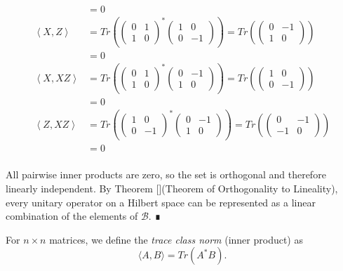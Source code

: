 \begin{theorem}
\begin{align*}
            &= 0\\
\left<X, Z\right> &= Tr\left( \begin{pmatrix}0 & 1 \\1 & 0\end{pmatrix}^* \begin{pmatrix}1 & 0 \\0 & -1\end{pmatrix} \right) = Tr\left(\begin{pmatrix}0 & -1 \\1 & 0\end{pmatrix}\right)\\
            &= 0\\
\left<X, XZ\right> &= Tr\left( \begin{pmatrix}0 & 1 \\1 & 0\end{pmatrix}^* \begin{pmatrix}0 & -1 \\1 & 0\end{pmatrix} \right) = Tr\left(\begin{pmatrix}1 & 0 \\0 & -1\end{pmatrix}\right)\\
            &= 0\\
\left<Z, XZ\right> &= Tr\left( \begin{pmatrix}1 & 0 \\0 & -1\end{pmatrix}^* \begin{pmatrix}0 & -1 \\1 & 0\end{pmatrix} \right) = Tr\left(\begin{pmatrix}0 & -1 \\-1 & 0\end{pmatrix}\right)\\
            &= 0\\
\end{align*}

All pairwise inner products are zero, so the set is orthogonal and therefore linearly independent. By Theorem [](Theorem of Orthogonality to Lineality), every unitary operator on a Hilbert space can be represented as a linear combination of the elements of $\mathcal{B}$. ∎

\end{theorem}\begin{definition}\label{trace_class_norm}For $n\times n$ matrices, we define the \textit{trace class norm} (inner product) as
\begin{equation}
\langle A, B \rangle = Tr(A^*B).
\end{equation}


\end{definition}
